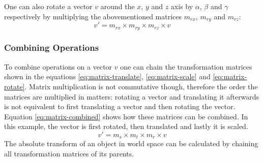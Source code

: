 One can also rotate a vector $v$ around the $x$, $y$ and $z$ axis by $\alpha$, $\beta$ and $\gamma$ respectively by multiplying the abovementioned matrices $m_{rx}$, $m_{ry}$ and $m_{rz}$:%
\begin{equation}
    v' = m_{rx} \times m_{ry} \times m_{rz} \times v%
    \label{eq:matrix-rotate}
\end{equation}

\subsubsection{Combining Operations}
To combine operations on a vector $v$ one can chain the transformation matrices shown in the equations \ref{eq:matrix-translate}, \ref{eq:matrix-scale} and \ref{eq:matrix-rotate}. Matrix multiplication is not commutative though, therefore the order the matrices are multiplied in matters: rotating a vector and translating it afterwards is not equivalent to first translating a vector and then rotating the vector. Equation \ref{eq:matrix-combined} shows how these matrices can be combined. In this example, the vector is first rotated, then translated and lastly it is scaled.
\begin{equation}
    v' = m_s \times m_t \times m_r \times v
    \label{eq:matrix-combined}
\end{equation}
The absolute transform of an object in world space can be calculated by chaining all transformation matrices of its parents.

